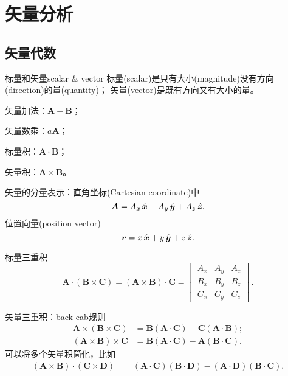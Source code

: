 
\chapter{矢量分析}
\label{chap:vector analysis}

\section{矢量代数}
\label{sec:vector algebra}

\begin{definition}
    {标量和矢量}{scalar & vector}
    标量(scalar)是只有大小(magnitude)没有方向(direction)的量(quantity)；
    矢量(vector)是既有方向又有大小的量。
\end{definition}

\begin{compactitem}
    \item 矢量加法：$\bm A+\bm B$；
    \item 矢量数乘：$a\bm A$；
    \item 标量积：$\bm A\cdot\bm B$；
    \item 矢量积：$\bm A\times\bm B$。
	\item 矢量的分量表示：直角坐标(Cartesian coordinate)中
	\begin{equation}
        \bm A=A_x\mathop{}\!\hat{\bm{x}}+A_y\mathop{}\!\hat{\bm{y}}+A_z\mathop{}\!\hat{\bm{z}}.
    \end{equation}
    位置向量(position vector)
    \begin{equation}
        \bm r=x\mathop{}\!\hat{\bm{x}}+y\mathop{}\!\hat{\bm{y}}+z\mathop{}\!\hat{\bm{z}}.
    \end{equation}
	\item 标量三重积
    \begin{equation}
        \bm A\cdot(\bm B\times\bm C)=(\bm A\times\bm B)\cdot\bm C
        =\begin{vmatrix}
            A_x&A_y&A_z\\
            B_x&B_y&B_z\\
            C_x&C_y&C_z
        \end{vmatrix}.
    \end{equation}
    \item 矢量三重积：back cab规则
    \begin{subequations}
        \begin{align}
            \label{eqn:bac-cab}
            \bm A\times(\bm B\times\bm C)&=\bm B(\bm A\cdot\bm C)-\bm C(\bm A\cdot\bm B);\\
            (\bm A\times\bm B)\times\bm C&=\bm B(\bm A\cdot\bm C)-\bm A(\bm B\cdot\bm C).
        \end{align}
    \end{subequations}
    可以将多个矢量积简化，比如
    \begin{align*}
        (\bm A\times\bm B)\cdot(\bm C\times\bm D)&=(\bm A\cdot\bm C)(\bm B\cdot\bm D)-(\bm A\cdot\bm D)(\bm B\cdot\bm C).
    \end{align*}
\end{compactitem}

